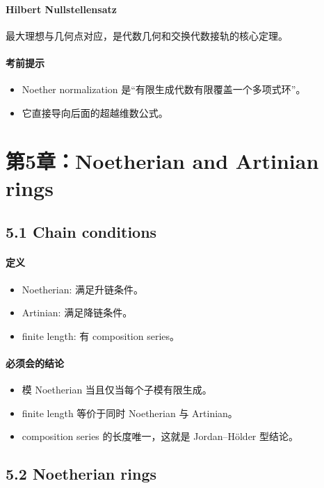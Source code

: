 \documentclass[a4paper]{ctexart}
\begin{document}
\paragraph{Hilbert Nullstellensatz}
最大理想与几何点对应，是代数几何和交换代数接轨的核心定理。

\paragraph{考前提示}
\begin{itemize}
  \item Noether normalization 是“有限生成代数有限覆盖一个多项式环”。
  \item 它直接导向后面的超越维数公式。
\end{itemize}

\section{第5章：Noetherian and Artinian rings}

\subsection{5.1 Chain conditions}

\paragraph{定义}
\begin{itemize}
  \item Noetherian: 满足升链条件。
  \item Artinian: 满足降链条件。
  \item finite length: 有 composition series。
\end{itemize}

\paragraph{必须会的结论}
\begin{itemize}
  \item 模 Noetherian 当且仅当每个子模有限生成。
  \item finite length 等价于同时 Noetherian 与 Artinian。
  \item composition series 的长度唯一，这就是 Jordan--H\"older 型结论。
\end{itemize}

\subsection{5.2 Noetherian rings}
\end{document}
